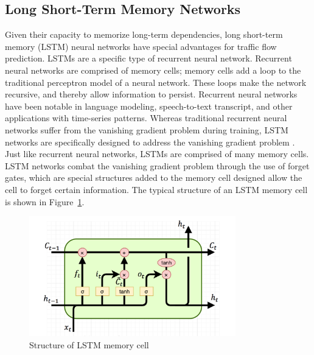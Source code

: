 \documentclass{article}
\begin{document}
\subsection{Long Short-Term Memory Networks}
Given their capacity to memorize long-term dependencies, long short-term memory (LSTM) neural networks have special advantages for traffic flow prediction. LSTMs are a specific type of recurrent neural network. Recurrent neural networks are comprised of memory cells; memory cells add a loop to the traditional perceptron model of a neural network. These loops make the network recursive, and thereby allow information to persist. Recurrent neural networks have been notable in language modeling, speech-to-text transcript, and other applications with time-series patterns. Whereas traditional recurrent neural networks suffer from the vanishing gradient problem during training, LSTM networks are specifically designed to address the vanishing gradient problem \citep{lstm}. Just like recurrent neural networks, LSTMs are comprised of many memory cells. LSTM networks combat the vanishing gradient problem through the use of forget gates, which are special structures added to the memory cell designed allow the cell to forget certain information. The typical structure of an LSTM memory cell is shown in Figure~\ref{fig:lstm_cell}.
\begin{figure}[ht]
    \centering
    \includegraphics[width=0.8\textwidth]{report/images/lstm_cell2.png}
    \caption{Structure of LSTM memory cell}
    \label{fig:lstm_cell}
\end{figure}
\end{document}
